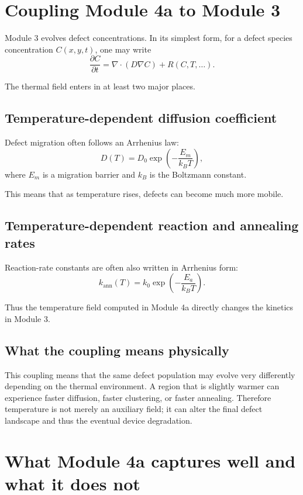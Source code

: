 \documentclass[11pt]{article}
\newcommand{\ann}{k_{\mathrm{ann}}}
\begin{document}
\section{Coupling Module 4a to Module 3}

Module 3 evolves defect concentrations. In its simplest form, for a defect species concentration $C(x,y,t)$, one may write
\[
\frac{\partial C}{\partial t} = \nabla \cdot (D\nabla C) + R(C,T,\ldots).
\]

The thermal field enters in at least two major places.

\subsection{Temperature-dependent diffusion coefficient}

Defect migration often follows an Arrhenius law:
\[
D(T) = D_0 \exp\left(-\frac{E_m}{k_B T}\right),
\]
where $E_m$ is a migration barrier and $k_B$ is the Boltzmann constant.

This means that as temperature rises, defects can become much more mobile.

\subsection{Temperature-dependent reaction and annealing rates}

Reaction-rate constants are often also written in Arrhenius form:
\[
\ann(T) = k_0 \exp\left(-\frac{E_a}{k_B T}\right).
\]

Thus the temperature field computed in Module 4a directly changes the kinetics in Module 3.

\subsection{What the coupling means physically}

This coupling means that the same defect population may evolve very differently depending on the thermal environment. A region that is slightly warmer can experience faster diffusion, faster clustering, or faster annealing. Therefore temperature is not merely an auxiliary field; it can alter the final defect landscape and thus the eventual device degradation.

\section{What Module 4a captures well and what it does not}
\end{document}

